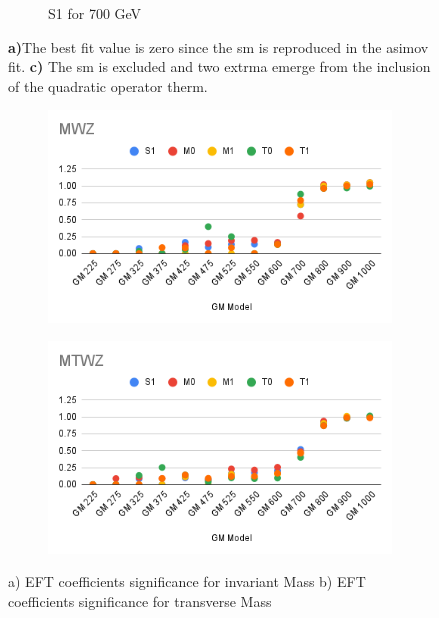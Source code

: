 \documentclass[../Bachelorarbeit.tex]{subfiles}
\begin{document}
\begin{figure}[h]
\begin{subfigure}{0.3\textwidth}
        \caption{S1 for 700 GeV}
    \end{subfigure}
    \caption{\textbf{a)}The best fit value is zero since the \acrshort{sm} is reproduced in the asimov fit.
        \textbf{c)} The \acrshort{sm} is excluded and two extrma emerge from the inclusion of the quadratic operator therm.}
    \label{fig:EFT_GM_Asimov_comparision}
\end{figure}

\begin{figure}[h]
    \centering
    \begin{subfigure}{0.45\textwidth}
        \includegraphics[width=\textwidth]{Plots/significans/MWZ.png}
        \caption{}
    \end{subfigure}
    \begin{subfigure}{0.45\textwidth}
        \includegraphics[width=\textwidth]{Plots/significans/MTWZ.png}
        \caption{}
    \end{subfigure}
    \caption{a) EFT coefficients significance for invariant Mass b) EFT coefficients significance for transverse Mass}
    \label{fig:significans_plots}
\end{figure}
\end{document}
